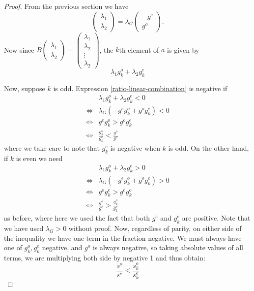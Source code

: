 \documentclass[11pt]{article}
\theoremstyle{definition}
\theoremstyle{remark}
\numberwithin{equation}{section}
\begin{document}
\begin{proof}
From the previous section we have 
\[\begin{pmatrix} \lambda_1 \\ \lambda_2 \end{pmatrix} = \lambda_G \begin{pmatrix} -g^e \\ g^o \end{pmatrix}.\]
Now since $B \begin{pmatrix} \lambda_1 \\ \lambda_2 \end{pmatrix} = \begin{pmatrix} \lambda_1 \\ \lambda_2 \\ \vdots \\ \lambda_2 \end{pmatrix}$, the $k$th element of $a$ is given by 
\begin{equation}\label{ratio-linear-combination} \lambda_1 g_k^o + \lambda_2 g_k^e \end{equation}

Now, suppose $k$ is odd. Expression \ref{ratio-linear-combination} is negative if \begin{align*}
&\lambda_1 g_k^o + \lambda_2 g_k^e < 0\\
\iff & \lambda_G(-g^e g_k^o + g^o g_k^e) < 0 \\
\iff & g^eg_k^o > g^og_k^e\\
\iff & \frac{g_k^o}{g_k^e} < \frac{g^o}{g^e}
\end{align*} where we take care to note that $g_k^e$ is negative when $k$ is odd. On the other hand, if $k$ is even we need
\begin{align*}
&\lambda_1 g_k^o + \lambda_2 g_k^e > 0\\
\iff & \lambda_G(-g^e g_k^o + g^o g_k^e) > 0 \\
\iff & g^og_k^e > g^eg_k^o\\
\iff & \frac{g^o}{g^e} > \frac{g^o_k}{g^e_k}
\end{align*} as before, where here we used the fact that both $g^e$ and $g^e_k$ are positive. Note that we have used $\lambda_G > 0$ without proof. Now, regardless of parity, on either side of the inequality we have one term in the fraction negative. We must always have one of $g^o_k, g^e_k$ negative, and $g^o$ is always negative, so taking absolute values of all terms, we are multiplying both side by negative 1 and thus obtain: 
\[ \frac{s^o}{s^e} < \frac{s^o_k}{s^e_k}\]
\end{proof}
\end{document}
